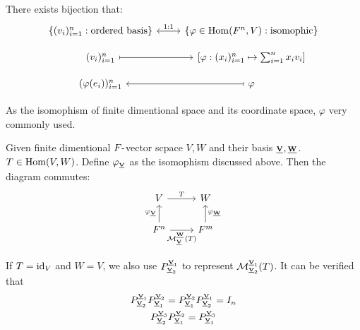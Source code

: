 \begin{proposition}
    There exists bijection that:
    \[
        \begin{tikzcd}[row sep=small]
            \{ (v_i)_{i=1}^n: \text{ordered basis} \} \arrow[leftrightarrow, r, "1:1"]
            & \{ \varphi \in \Hom(F^n, V): \text{isomophic} \} \\
            (v_i)_{i=1}^n  \arrow[mapsto, r]
            & \left[\varphi: (x_i)_{i=1}^n \mapsto \sum_{i=1}^n x_i v_i \right] \\
            (\varphi(e_i))_{i=1}^n
            & \varphi  \arrow[mapsto, l]
        \end{tikzcd}
    \]
\end{proposition}
As the isomophism of finite dimentional space and its coordinate space, $\varphi$ very commonly used.



\begin{proposition}
    Given finite dimentional $F\mbox{-}$vector scpace $V, W$ and their basis $\bs{V}{}, \bs{W}{}$. $T \in \operatorname{Hom}(V, W)$. Define $\varphi_{\bss{V}{}}$ as the isomophism discussed above. Then the diagram commutes:
    \[
        \begin{tikzcd}
            V \arrow[r, "T"]
            & W
            \\
            F^n \arrow[u, "\varphi_{\bss{V}{}}"] \arrow[r, "\calM^{\bss{W}{}}_{\bss{V}{}}(T)"']
            & F^m \arrow[u, "\varphi_{\bss{W}{}}"']
        \end{tikzcd}
    \]
\end{proposition}
If $T = \operatorname{id}_{V}$ and $W = V$, we also use $P^{\bss{V}{1}}_{\bss{V}{2}}$ to represent $\calM^{\bss{V}{1}}_{\bss{V}{2}}(T)$. It can be verified that 
\begin{gather*}
    P^{\bss{V}{1}}_{\bss{V}{2}} P^{\bss{V}{2}}_{\bss{V}{1}} = P^{\bss{V}{2}}_{\bss{V}{1}} P^{\bss{V}{1}}_{\bss{V}{2}} = I_n \\
    P^{\bss{V}{3}}_{\bss{V}{2}} P^{\bss{V}{2}}_{\bss{V}{1}} = P^{\bss{V}{3}}_{\bss{V}{1}}
\end{gather*}





